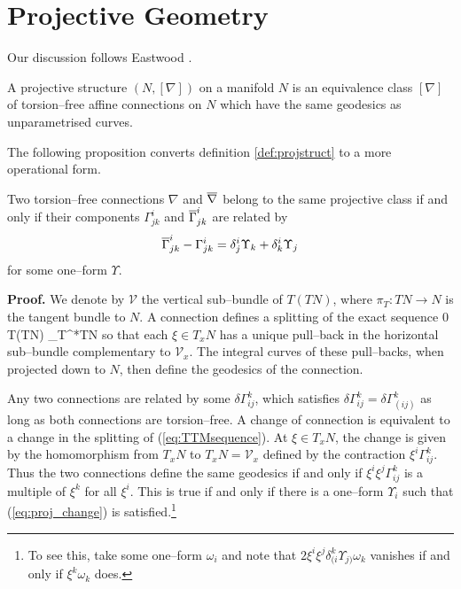 \section{Projective Geometry}\label{sec:projgeom}

Our discussion follows Eastwood \cite{Eastwood}.

\begin{defi}\label{def:projstruct} A projective structure $(N,[\nabla])$
on a manifold $N$ is an equivalence class $[\nabla]$ of torsion--free affine connections on $N$ which have the same geodesics as unparametrised curves.
\end{defi}

The following proposition converts definition \ref{def:projstruct} to a more operational form.

\begin{prop} Two torsion--free connections $\nabla$ and $\overline{\nabla}$ belong to the same projective class if and only if their components $\Gamma^i_{jk}$ and $\overline{\Gamma}^i_{jk}$ are related by
\begin{equation}
\overline{\Gamma}^i_{jk} - \Gamma^i_{jk} = \delta_{j}^{i}\Upsilon_{k}+\delta_{k}^{i}\Upsilon_{j}\label{eq:proj_change}
\end{equation}
for some one--form $\Upsilon.$
\end{prop}

{\bf Proof.} We denote by $\mathcal{V}$ the vertical sub--bundle of $T(TN)$, where $\pi_T:TN\rightarrow N$ is the tangent bundle to $N$. A connection defines a splitting of the exact sequence
\be \label{eq:TTMsequence}
0 \longrightarrow {} \longrightarrow T(TN) \longrightarrow \pi_T^*TN 
\ee
so that each $\xi\in T_xN$ has a unique pull--back in the horizontal sub--bundle complementary to $\mathcal{V}_x$. The integral curves of these pull--backs, when projected down to $N$, then define the geodesics of the connection.

Any two connections are related by some $\delta\Gamma^k_{ij}$, which satisfies $\delta\Gamma^k_{ij}=\delta\Gamma^k_{(ij)}$ as long as both connections are torsion--free. A change of connection is equivalent to a change in the splitting of (\ref{eq:TTMsequence}). At $\xi\in T_xN$, the change is given by the homomorphism from $T_xN$ to $T_xN=\mathcal{V}_x$ defined by the contraction $\xi^i\Gamma^k_{ij}$. Thus the two connections define the same geodesics if and only if $\xi^i\xi^j\Gamma^k_{ij}$ is a multiple of $\xi^k$ for all $\xi^i$. This is true if and only if there is a one--form $\Upsilon_i$ such that (\ref{eq:proj_change}) is satisfied.\footnote{To see this, take some one--form $\omega_i$ and note that $2\xi^i\xi^j\delta^k_{(i}\Upsilon_{j)}\omega_k$ vanishes if and only if $\xi^k\omega_k$ does.}
\koniec

